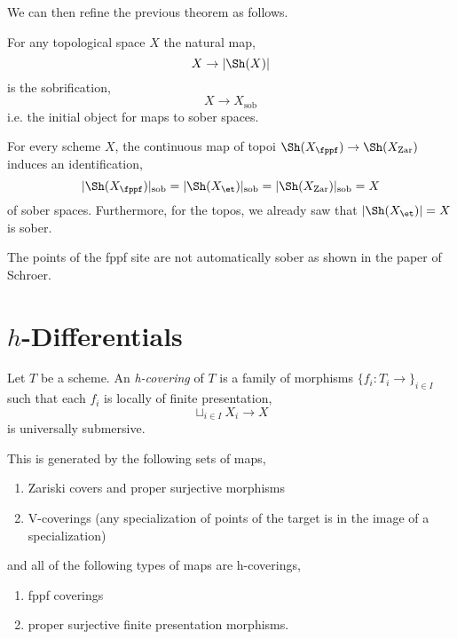\documentclass[12pt]{article}
\begin{document}
We can then refine the previous theorem as follows. 

\newcommand{\sob}{\mathrm{sob}}

\begin{prop}
For any topological space $X$ the natural map,
\[ X \to |\Sh(X)| \]
is the sobrification,
\[ X \to X_{\sob} \]
i.e. the initial object for maps to sober spaces.
\end{prop}

\begin{theorem} 
For every scheme $X$, the continuous map of topoi $\Sh(X_{\fppf}) \to \Sh(X_{\Zar})$ induces an identification,
\[ | \Sh(X_{\fppf}) |_{\sob} = | \Sh(X_{\et}) |_{\sob} = | \Sh(X_{\Zar}) |_{\sob} = X \]
of sober spaces. Furthermore, for the \etale topos, we already saw that $| \Sh(X_{\et}) | = X$ is sober. 
\end{theorem}

\begin{rmk}
The points of the fppf site are not automatically sober as shown in the paper of Schroer.
\end{rmk}

\section{$h$-Differentials}

\begin{defn}
Let $T$ be a scheme. An \textit{h-covering} of $T$ is a family of morphisms $\{ f_i : T_i \to \}_{i \in I}$ such that each $f_i$ is locally of finite presentation,
\[ \sqcup_{i \in I} X_i \to X \]
is universally submersive. 
\end{defn}

\begin{rmk}
This is generated by the following sets of maps,
\begin{enumerate}
\item Zariski covers and proper surjective morphisms
\item V-coverings (any specialization of points of the target is in the image of a specialization)
\end{enumerate}
and all of the following types of maps are h-coverings,
\begin{enumerate}
\item fppf coverings
\item proper surjective finite presentation morphisms.
\end{enumerate}
\end{rmk}
\end{document}
